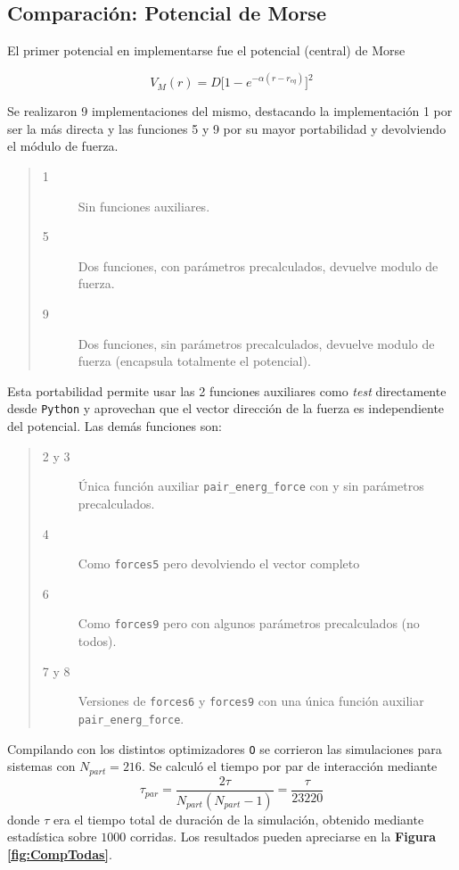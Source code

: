 \documentclass[twoside, 12pt]{article}
\begin{document}
\subsection{Comparación: Potencial de Morse}

El primer potencial en implementarse fue el potencial (central) de Morse

\[ V_{M} (r) = D\big[1-e^{-\alpha (r-r_{eq})}\big]^2\]

Se realizaron 9 implementaciones del mismo, destacando la implementaci\'on 1 por ser la m\'as directa y las funciones 5 y 9 por su mayor portabilidad y devolviendo el módulo de fuerza.

\begin{quote}
\begin{description}
\item[1] Sin funciones auxiliares.
\item[5] Dos funciones, con parámetros precalculados, devuelve modulo de fuerza.
\item[9] Dos funciones, sin parámetros precalculados, devuelve modulo de fuerza (encapsula totalmente el potencial).
\end{description}
\end{quote}

Esta portabilidad permite usar las 2 funciones auxiliares como \textit{test} directamente desde \texttt{Python} y aprovechan que el vector dirección de la fuerza es independiente del potencial. Las demás funciones son:

\begin{quote}
\begin{description}
\item[2 y 3] Única función auxiliar \texttt{pair\_energ\_force} con y sin parámetros precalculados.
\item[4] Como \texttt{forces5} pero devolviendo el vector completo
\item[6] Como \texttt{forces9} pero con algunos parámetros precalculados (no todos).
\item[7 y 8] Versiones de \texttt{forces6} y \texttt{forces9} con una única función auxiliar \texttt{pair\_energ\_force}.
\end{description}
\end{quote}

Compilando con los distintos optimizadores \texttt{O} se corrieron las simulaciones para sistemas con $N_{part}=216$. Se calcul\'o el tiempo por par de interacci\'on mediante 
\[ \tau_{par}=\frac{2\tau}{N_{part}(N_{part}-1)} =\frac{\tau}{23220} \]
donde $\tau$ era el tiempo total de duraci\'on de la simulaci\'on, obtenido mediante estad\'istica sobre $1000$ corridas. Los resultados pueden apreciarse en la \textbf{Figura \ref{fig:CompTodas}}.
\end{document}

